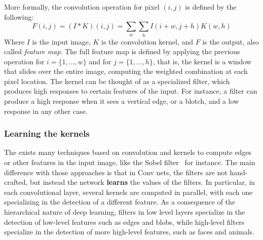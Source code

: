 \documentclass[../main.tex]{subfiles}
\begin{document}

    More formally, the convolution operation for pixel $(i, j)$ is defined by the following:
    \begin{equation}
        F(i, j) = (I \ast K)(i, j) = \sum_{w} \sum_{h} I(i + w, j + h) K(w, h)
    \end{equation}
    Where $I$ is the input image, $K$ is the convolution kernel, and $F$ is the output, also called \textit{feature map}. The full
    feature map is defined by applying the previous operation for $i = \{1, \ldots, w\}$ and for $j = \{1, \ldots, h\}$, that is, the kernel
    is a window that slides over the entire image, computing the weighted combination at each pixel location. The kernel can be thought
    of as a specialized filter, which produces high responses to certain features of the input. For instance, a filter can produce a
    high response when it sees a vertical edge, or a blotch, and a low response in any other case.

    \subsubsection{Learning the kernels}
    The exists many techniques based on convolution and kernels to compute edges or other features in the input image, like the Sobel
	filter~\cite{gao2010improved} for instance.
    The main difference with those approaches is that in Conv nets, the filters are not hand-crafted, but instead the network \textbf{learns}
    the values of the filters. In particular, in each convolutional layer, several kernels are computed in parallel, with each one specializing
    in the detection of a different feature. As a consequence of the hierarchical nature of deep learning, filters in low level layers specialize
    in the detection of low-level features such as edges and blobs, while high-level filters specialize in the detection of more high-level features,
    such as faces and animals.
\end{document}
